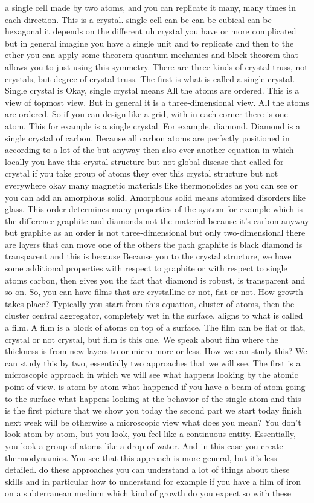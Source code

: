 a single cell made by two atoms, and you can replicate it many, many times in each direction. This is a crystal. single cell can be can be cubical can be hexagonal it depends on the different uh crystal you have or more complicated but in general imagine you have a single unit and to replicate and then to the ether you can apply some theorem quantum mechanics and block theorem that allows you to just using this symmetry. There are three kinds of crystal truss, not crystals, but degree of crystal truss. The first is what is called a single crystal. Single crystal is Okay, single crystal means All the atoms are ordered. This is a view of topmost view. But in general it is a three-dimensional view. All the atoms are ordered. So if you can design like a grid, with in each corner there is one atom. This for example is a single crystal. For example, diamond. Diamond is a single crystal of carbon. Because all carbon atoms are perfectly positioned in according to a lot of the but anyway then also ever another equation in which locally you have this crystal structure but not global disease that called for crystal if you take group of atoms they ever this crystal structure but not everywhere okay many magnetic materials like thermonolides as you can see or you can add an amorphous solid. Amorphous solid means atomized disorders like glass. This order determines many properties of the system for example which is the difference graphite and diamonds not the material because it's carbon anyway but graphite as an order is not three-dimensional but only two-dimensional there are layers that can move one of the others the path graphite is black diamond is transparent and this is because Because you to the crystal structure, we have some additional properties with respect to graphite or with respect to single atoms carbon, then gives you the fact that diamond is robust, is transparent and so on. So, you can have films that are crystalline or not, flat or not. How growth takes place? Typically you start from this equation, cluster of atoms, then the cluster central aggregator, completely wet in the surface, aligns to what is called a film. A film is a block of atoms on top of a surface. The film can be flat or flat, crystal or not crystal, but film is this one. We speak about film where the thickness is from new layers to or micro more or less. How we can study this? We can study this by two, essentially two approaches that we will see. The first is a microscopic approach in which we will see what happens looking by the atomic point of view. is atom by atom what happened if you have a beam of atom going to the surface what happens looking at the behavior of the single atom and this is the first picture that we show you today the second part we start today finish next week will be otherwise a microscopic view what does you mean? You don't look atom by atom, but you look, you feel like a continuous entity. Essentially, you look a group of atoms like a drop of water. And in this case you create thermodynamics. You see that this approach is more general, but it's less detailed. do these approaches you can understand a lot of things about these skills and in particular how to understand for example if you have a film of iron on a subterranean medium which kind of growth do you expect so with these 
